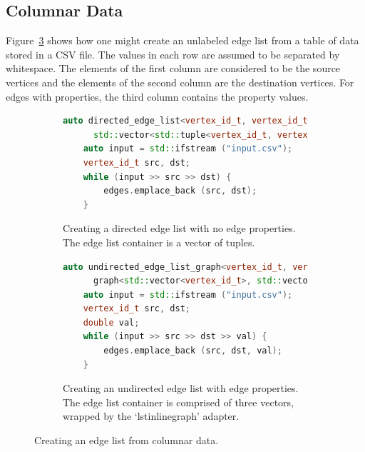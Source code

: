 \subsection{Columnar Data}

Figure~\ref{fig:edge_list_from_columnar_data}
shows how one might create an unlabeled edge list from a table of data stored in a CSV file.
The values in each row are assumed to be separated by whitespace.
The elements of the first column are considered to be the source vertices and the elements of
the second column are the destination vertices. For edges with properties, the third column
contains the property values.

\begin{figure}[ht]
  \begin{center}
    \begin{subfigure}{0.48\textwidth}
      \begin{lstlisting}[language=C++]
    auto directed_edge_list<vertex_id_t, vertex_id_t>
      std::vector<std::tuple<vertex_id_t, vertex_id_t> edges;
    auto input = std::ifstream ("input.csv");
    vertex_id_t src, dst;
    while (input >> src >> dst) {
        edges.emplace_back (src, dst);
    }
      \end{lstlisting}
      \caption{Creating a directed edge list with no edge properties.
      The edge list container is a vector of tuples.
      \label{subfig:edge_list_no_properties}}
    \end{subfigure}
    \begin{subfigure}{0.48\textwidth}
      \begin{lstlisting}[language=C++]
    auto undirected_edge_list_graph<vertex_id_t, vertex_id_t, double>
      graph<std::vector<vertex_id_t>, std::vector<vertex_id_t>, std::vector<double>> edges;
    auto input = std::ifstream ("input.csv");
    vertex_id_t src, dst;
    double val;
    while (input >> src >> dst >> val) {
        edges.emplace_back (src, dst, val);
    }
      \end{lstlisting}
      \caption{Creating an undirected edge list with edge properties.
      The edge list container is comprised of three vectors, wrapped by
      the `lstinline{graph}' adapter.
      \label{subfig:edge_list_with_properties}}
    \end{subfigure}
    \caption{Creating an edge list from columnar data.\label{fig:edge_list_from_columnar_data}}
  \end{center}
\end{figure}

